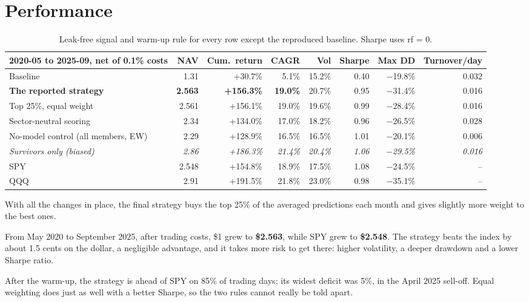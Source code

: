 \documentclass[10pt]{article}
\begin{document}
\section{Performance}
\begin{table}[h]
\centering\small
\begin{tabular}{lrrrrrrr}
\toprule
2020-05 to 2025-09, net of 0.1\% costs & NAV & Cum.\ return & CAGR & Vol & Sharpe & Max DD & Turnover/day\\
\midrule
Baseline & 1.31 & +30.7\% & 5.1\% & 15.2\% & 0.40 & $-$19.8\% & 0.032\\
\textbf{The reported strategy} & \textbf{2.563} & \textbf{+156.3\%} & \textbf{19.0\%} & 20.7\% & 0.95 & $-$31.4\% & 0.016\\
Top 25\%, equal weight & 2.561 & +156.1\% & 19.0\% & 19.6\% & 0.99 & $-$28.4\% & 0.016\\
Sector-neutral scoring & 2.34 & +134.0\% & 17.0\% & 18.2\% & 0.96 & $-$26.5\% & 0.028\\
No-model control (all members, EW) & 2.29 & +128.9\% & 16.5\% & 16.5\% & 1.01 & $-$20.1\% & 0.006\\
\textit{Survivors only (biased)} & \textit{2.86} & \textit{+186.3\%} & \textit{21.4\%} & \textit{20.4\%} & \textit{1.06} & \textit{$-$29.5\%} & \textit{0.016}\\
SPY & 2.548 & +154.8\% & 18.9\% & 17.5\% & 1.08 & $-$24.5\% & --\\
QQQ & 2.91 & +191.5\% & 21.8\% & 23.0\% & 0.98 & $-$35.1\% & --\\
\bottomrule
\end{tabular}
\caption{Leak-free signal and warm-up rule for every row except the reproduced baseline. Sharpe uses
rf = 0.}
\label{tab:perf}
\end{table}

With all the changes in place, the final strategy buys the top 25\% of the averaged predictions each
month and gives slightly more weight to the best ones.

From May 2020 to September 2025, after trading costs, \$1 grew to \textbf{\$2.563}, while SPY grew to
\textbf{\$2.548}. The strategy beats the index by about 1.5 cents on the dollar, a negligible
advantage, and it takes more risk to get there: higher volatility, a deeper drawdown and a lower
Sharpe ratio.

After the warm-up, the strategy is ahead of SPY on 85\% of trading days; its widest deficit was 5\%, in
the April 2025 sell-off. Equal weighting does just as well with a better Sharpe, so the two rules
cannot really be told apart.
\end{document}
